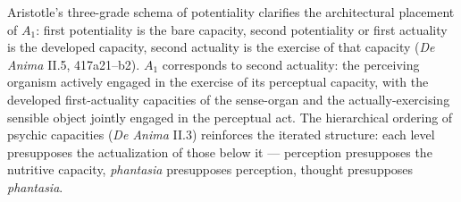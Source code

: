 \documentclass{article}
\begin{document}
Aristotle's three-grade schema of potentiality clarifies the architectural placement of $A_1$: first potentiality is the bare capacity, second potentiality or first actuality is the developed capacity, second actuality is the exercise of that capacity (\textit{De Anima} II.5, 417a21--b2). $A_1$ corresponds to second actuality: the perceiving organism actively engaged in the exercise of its perceptual capacity, with the developed first-actuality capacities of the sense-organ and the actually-exercising sensible object jointly engaged in the perceptual act. The hierarchical ordering of psychic capacities (\textit{De Anima} II.3) reinforces the iterated structure: each level presupposes the actualization of those below it --- perception presupposes the nutritive capacity, \textit{phantasia} presupposes perception, thought presupposes \textit{phantasia}.
\end{document}
